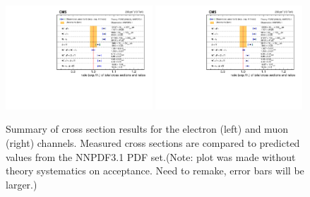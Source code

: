 \begin{figure}[htpb]
\includegraphics[width=0.49\textwidth]{plots/Results/xsecSummary13TeV_ele.pdf}
\includegraphics[width=0.49\textwidth]{plots/Results/xsecSummary13TeV_muon.pdf}
\caption{Summary of cross section results for the \sh electron (left) and muon (right) channels. Measured cross sections are compared to predicted values from the NNPDF3.1 PDF set.(Note: plot was made without theory systematics on acceptance. Need to remake, error bars will be larger.)}
\label{fig:xs:13}
\end{figure}